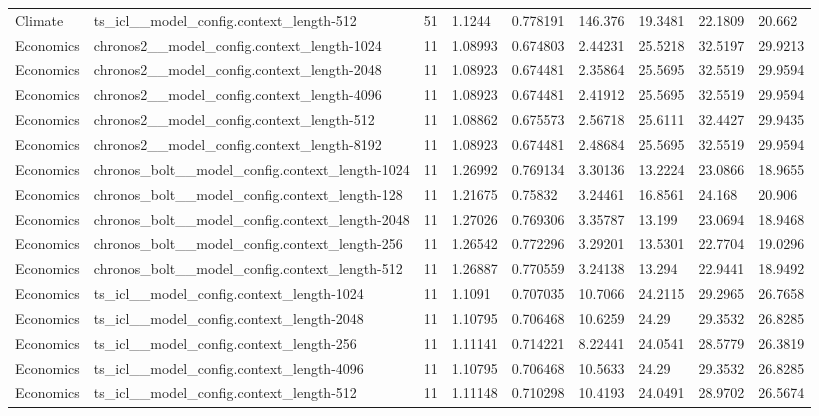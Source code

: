 \begin{tabular}{lllllllll}
Climate & ts\_icl\_\_model\_config.context\_length-512 & 51 & 1.1244 & 0.778191 & 146.376 & 19.3481 & 22.1809 & 20.662 \\
Economics & chronos2\_\_model\_config.context\_length-1024 & 11 & 1.08993 & 0.674803 & 2.44231 & 25.5218 & 32.5197 & 29.9213 \\
Economics & chronos2\_\_model\_config.context\_length-2048 & 11 & 1.08923 & 0.674481 & 2.35864 & 25.5695 & 32.5519 & 29.9594 \\
Economics & chronos2\_\_model\_config.context\_length-4096 & 11 & 1.08923 & 0.674481 & 2.41912 & 25.5695 & 32.5519 & 29.9594 \\
Economics & chronos2\_\_model\_config.context\_length-512 & 11 & 1.08862 & 0.675573 & 2.56718 & 25.6111 & 32.4427 & 29.9435 \\
Economics & chronos2\_\_model\_config.context\_length-8192 & 11 & 1.08923 & 0.674481 & 2.48684 & 25.5695 & 32.5519 & 29.9594 \\
Economics & chronos\_bolt\_\_model\_config.context\_length-1024 & 11 & 1.26992 & 0.769134 & 3.30136 & 13.2224 & 23.0866 & 18.9655 \\
Economics & chronos\_bolt\_\_model\_config.context\_length-128 & 11 & 1.21675 & 0.75832 & 3.24461 & 16.8561 & 24.168 & 20.906 \\
Economics & chronos\_bolt\_\_model\_config.context\_length-2048 & 11 & 1.27026 & 0.769306 & 3.35787 & 13.199 & 23.0694 & 18.9468 \\
Economics & chronos\_bolt\_\_model\_config.context\_length-256 & 11 & 1.26542 & 0.772296 & 3.29201 & 13.5301 & 22.7704 & 19.0296 \\
Economics & chronos\_bolt\_\_model\_config.context\_length-512 & 11 & 1.26887 & 0.770559 & 3.24138 & 13.294 & 22.9441 & 18.9492 \\
Economics & ts\_icl\_\_model\_config.context\_length-1024 & 11 & 1.1091 & 0.707035 & 10.7066 & 24.2115 & 29.2965 & 26.7658 \\
Economics & ts\_icl\_\_model\_config.context\_length-2048 & 11 & 1.10795 & 0.706468 & 10.6259 & 24.29 & 29.3532 & 26.8285 \\
Economics & ts\_icl\_\_model\_config.context\_length-256 & 11 & 1.11141 & 0.714221 & 8.22441 & 24.0541 & 28.5779 & 26.3819 \\
Economics & ts\_icl\_\_model\_config.context\_length-4096 & 11 & 1.10795 & 0.706468 & 10.5633 & 24.29 & 29.3532 & 26.8285 \\
Economics & ts\_icl\_\_model\_config.context\_length-512 & 11 & 1.11148 & 0.710298 & 10.4193 & 24.0491 & 28.9702 & 26.5674 \\

\end{tabular}
